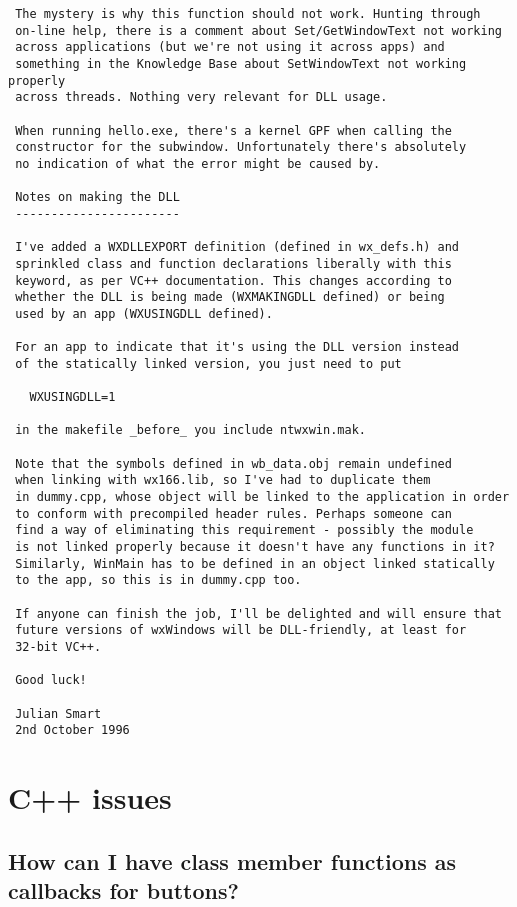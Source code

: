 {\begin{verbatim}
 The mystery is why this function should not work. Hunting through
 on-line help, there is a comment about Set/GetWindowText not working
 across applications (but we're not using it across apps) and
 something in the Knowledge Base about SetWindowText not working properly
 across threads. Nothing very relevant for DLL usage.
 
 When running hello.exe, there's a kernel GPF when calling the
 constructor for the subwindow. Unfortunately there's absolutely
 no indication of what the error might be caused by.
 
 Notes on making the DLL
 -----------------------
 
 I've added a WXDLLEXPORT definition (defined in wx_defs.h) and
 sprinkled class and function declarations liberally with this
 keyword, as per VC++ documentation. This changes according to
 whether the DLL is being made (WXMAKINGDLL defined) or being
 used by an app (WXUSINGDLL defined).
 
 For an app to indicate that it's using the DLL version instead
 of the statically linked version, you just need to put
 
   WXUSINGDLL=1
   
 in the makefile _before_ you include ntwxwin.mak.
 
 Note that the symbols defined in wb_data.obj remain undefined
 when linking with wx166.lib, so I've had to duplicate them
 in dummy.cpp, whose object will be linked to the application in order
 to conform with precompiled header rules. Perhaps someone can
 find a way of eliminating this requirement - possibly the module
 is not linked properly because it doesn't have any functions in it?
 Similarly, WinMain has to be defined in an object linked statically
 to the app, so this is in dummy.cpp too.
 
 If anyone can finish the job, I'll be delighted and will ensure that
 future versions of wxWindows will be DLL-friendly, at least for
 32-bit VC++.
 
 Good luck!
 
 Julian Smart
 2nd October 1996
\end{verbatim}
}

\chapter{C++ issues}

\section{How can I have class member functions as callbacks
for buttons?}

